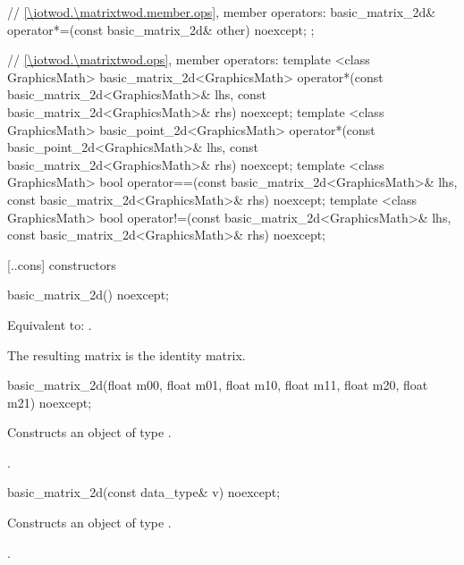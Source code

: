 \begin{codeblock}
{{    // \ref{\iotwod.\matrixtwod.member.ops}, member operators:
    basic_matrix_2d& operator*=(const basic_matrix_2d& other) noexcept;
  };

  // \ref{\iotwod.\matrixtwod.ops}, member operators:
  template <class GraphicsMath>
  basic_matrix_2d<GraphicsMath> operator*(const basic_matrix_2d<GraphicsMath>& lhs,
    const basic_matrix_2d<GraphicsMath>& rhs) noexcept;
  template <class GraphicsMath>
  basic_point_2d<GraphicsMath> operator*(const basic_point_2d<GraphicsMath>& lhs,
    const basic_matrix_2d<GraphicsMath>& rhs) noexcept;
  template <class GraphicsMath>
  bool operator==(const basic_matrix_2d<GraphicsMath>& lhs,
    const basic_matrix_2d<GraphicsMath>& rhs) noexcept;
  template <class GraphicsMath>
  bool operator!=(const basic_matrix_2d<GraphicsMath>& lhs,
    const basic_matrix_2d<GraphicsMath>& rhs) noexcept;
}
\end{codeblock}

 [\iotwod.\matrixtwod.cons] { constructors}

%
\begin{itemdecl}
basic_matrix_2d() noexcept;
\end{itemdecl}
\begin{itemdescr}
\pnum
\effects
Equivalent to: .

\pnum
\begin{note}
The resulting matrix is the identity matrix.
\end{note}
\end{itemdescr}

%
\begin{itemdecl}
basic_matrix_2d(float m00, float m01, float m10, float m11,
  float m20, float m21) noexcept;
\end{itemdecl}
\begin{itemdescr}
\pnum
\effects
Constructs an object of type .

\pnum
\postconditions{} .
\end{itemdescr}

%
\begin{itemdecl}
basic_matrix_2d(const data_type& v) noexcept;
\end{itemdecl}
\begin{itemdescr}
\pnum
\effects
Constructs an object of type .
	
\pnum
\postconditions{} .
\end{itemdescr}


